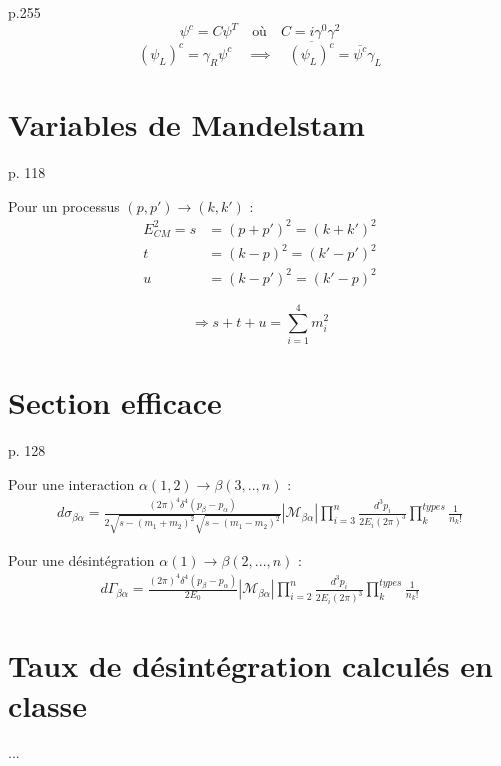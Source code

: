 \documentclass[12pt]{article}
\begin{document}
p.255 \\
\begin{equation}
  \psi^c = C\psi^T \quad \text{où} \quad C = i\gamma^0\gamma^2
\end{equation}
\begin{equation}
  (\psi_L)^c = \gamma_R\psi^c \quad \implies \quad \overline{(\psi_L)^c} = \overline{\psi^c}\gamma_L
\end{equation}

\section{Variables de Mandelstam}
p. 118

Pour un processus $(p, p') \rightarrow (k, k')$ :
\begin{align}
 E_{CM}^2 =  s &= (p + p')^2 = (k + k')^2 \\
  t &= (k - p)^2 = (k' - p')^2 \\
  u &= (k - p')^2 = (k' - p)^2
\end{align}

\begin{equation}
  \Rightarrow s+t+u = \sum_{i=1}^4 m_i^2
\end{equation}

\section{Section efficace}
p. 128

Pour une interaction $\alpha (1,2) \rightarrow \beta (3,.., n)$ :
\begin{align}
d\sigma_{\beta\alpha} = \frac{(2\pi)^4 \delta^{4}(p_\beta - p_\alpha)}{2 \sqrt{s - (m_1 + m_2)^2} \sqrt{s - (m_1 - m_2)^2}} |\mathcal{M_{\beta\alpha}}| \prod_{i=3}^n \frac{d^3p_i}{2E_i (2\pi)^3} \prod_{k}^{types} \frac{1}{n_k!}
\end{align}

Pour une désintégration $\alpha (1) \rightarrow \beta (2,..., n)$ :
\begin{align}
d\Gamma_{\beta\alpha} = \frac{(2\pi)^4 \delta^4 (p_\beta - p_\alpha)}{2E_0} |\mathcal{M_{\beta\alpha}}| \prod_{i=2}^n {\frac{d^3 p_i}{2 E_i (2\pi)^3}} \prod_{k}^{types} \frac{1}{n_k!}
\end{align}

\section{Taux de désintégration calculés en classe}
...
\end{document}
